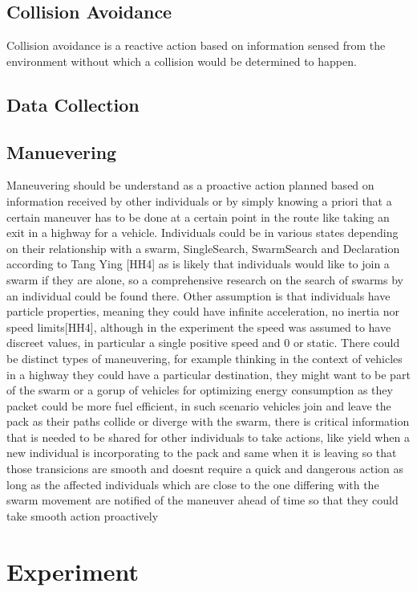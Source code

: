 \documentclass[journal]{IEEEtran}
\begin{document}
	\subsection{Collision Avoidance}
   Collision avoidance is a reactive action based on information sensed from the environment without which a collision would be determined to happen.
	\subsection{Data Collection}
	\subsection{Manuevering}
   Maneuvering should be understand as a proactive action planned based on information received by other individuals or by simply knowing a priori that a certain maneuver has to be done at a certain point in the route like taking an exit in a highway for a vehicle.
   Individuals could be in various states depending on their relationship with a swarm, SingleSearch, SwarmSearch and Declaration according to Tang Ying [HH4] as is likely that individuals would like to join a swarm if they are alone, so a comprehensive research on the search of swarms by an individual could be found there.
   Other assumption is that individuals have particle properties, meaning they could have infinite acceleration, no inertia nor speed limits[HH4], although in the experiment the speed was assumed to have discreet values, in particular a single positive speed and 0 or static.
   There could be distinct types of maneuvering, for example thinking in the context of vehicles in a highway they could have a particular destination, they might want to be part of the swarm or a gorup of vehicles for optimizing energy consumption as they packet could be more fuel efficient, in such scenario vehicles join and leave the pack as their paths collide or diverge with the swarm, there is critical information that is needed to be shared for other individuals to take actions, like yield when a new individual is incorporating to the pack and same when it is leaving so that those transicions are smooth and doesnt require a quick and dangerous action as long as the affected individuals which are close to the one differing with the swarm movement are notified of the maneuver ahead of time so that they could take smooth action proactively

\section{Experiment}
\end{document}
